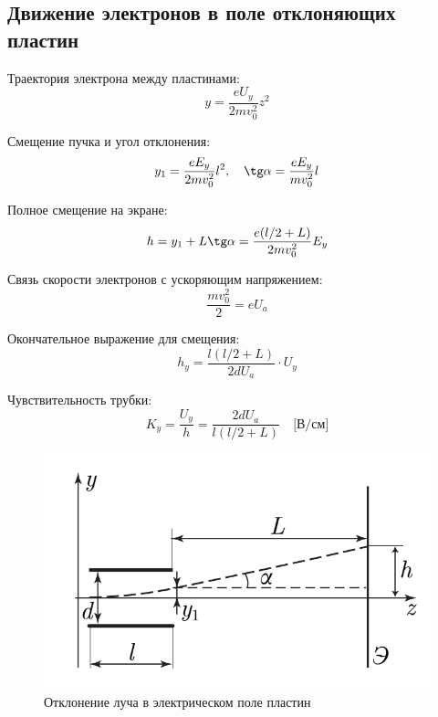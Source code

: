 \documentclass[a4paper, 12pt]{article}
\begin{document}
\subsection*{Движение электронов в поле отклоняющих пластин}

Траектория электрона между пластинами:
\begin{equation}
y = \frac{eU_y}{2mv_0^2}z^2
\end{equation}

Смещение пучка и угол отклонения:
\begin{equation}
y_1 = \frac{eE_y}{2mv_0^2}l^2, \quad \tg\alpha = \frac{eE_y}{mv_0^2}l
\end{equation}

Полное смещение на экране:
\begin{equation}
h = y_1 + L\tg\alpha = \frac{e(l/2 + L)}{2mv_0^2}E_y
\end{equation}

Связь скорости электронов с ускоряющим напряжением:
\begin{equation}
\frac{mv_0^2}{2} = eU_a
\end{equation}

Окончательное выражение для смещения:
\begin{equation}
h_y = \frac{l(l/2 + L)}{2dU_a} \cdot U_y
\end{equation}

Чувствительность трубки:
\begin{equation}
K_y = \frac{U_y}{h} = \frac{2dU_a}{l(l/2 + L)} \quad \text{[В/см]}
\end{equation}

\begin{figure}[h]
\centering
\includegraphics[width=0.8\linewidth]{рис 2.png}
\caption{Отклонение луча в электрическом поле пластин}
\label{fig:voltage_current}
\end{figure}
\end{document}
